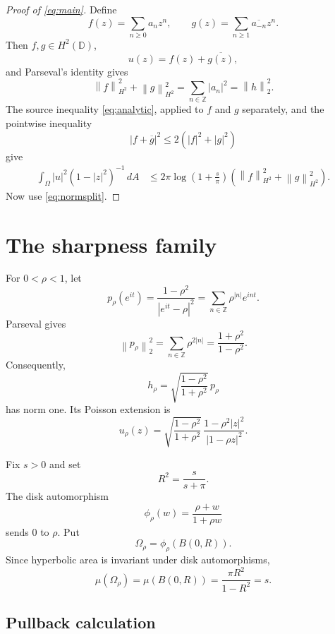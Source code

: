 \documentclass[11pt]{article}
\newcommand{\D}{\mathbb D}
\newcommand{\dd}{\,d}
\newcommand{\norm}[1]{\left\lVert#1\right\rVert}
\begin{document}
\begin{proof}[Proof of \eqref{eq:main}]
Define
\[
 f(z)=\sum_{n\ge0}a_nz^n,
 \qquad
 g(z)=\sum_{n\ge1}\overline{a_{-n}}z^n.
\]
Then \(f,g\in H^2(\D)\),
\[
 u(z)=f(z)+\overline{g(z)},
\]
and Parseval's identity gives
\begin{equation}\label{eq:normsplit}
 \norm{f}_{H^2}^2+\norm{g}_{H^2}^2
 =\sum_{n\in\mathbb Z}|a_n|^2
 =\norm{h}_2^2.
\end{equation}
The source inequality \eqref{eq:analytic}, applied to \(f\) and \(g\)
separately, and the pointwise inequality
\[
 |f+\overline g|^2\le2(|f|^2+|g|^2)
\]
give
\begin{align*}
 \int_\Omega |u|^2(1-|z|^2)^{-1}\dd A
 &\le
 2\pi\log\!\left(1+\frac{s}{\pi}\right)
 \left(\norm{f}_{H^2}^2+\norm{g}_{H^2}^2\right).
\end{align*}
Now use \eqref{eq:normsplit}.
\end{proof}

\section{The sharpness family}

For \(0<\rho<1\), let
\[
 p_\rho(e^{it})
 =\frac{1-\rho^2}{|e^{it}-\rho|^2}
 =\sum_{n\in\mathbb Z}\rho^{|n|}e^{int}.
\]
Parseval gives
\[
 \norm{p_\rho}_2^2
 =\sum_{n\in\mathbb Z}\rho^{2|n|}
 =\frac{1+\rho^2}{1-\rho^2}.
\]
Consequently,
\begin{equation}\label{eq:hrho}
 h_\rho
 =\sqrt{\frac{1-\rho^2}{1+\rho^2}}\,p_\rho
\end{equation}
has norm one. Its Poisson extension is
\begin{equation}\label{eq:urho}
 u_\rho(z)
 =\sqrt{\frac{1-\rho^2}{1+\rho^2}}\,
   \frac{1-\rho^2|z|^2}{|1-\rho z|^2}.
\end{equation}

Fix \(s>0\) and set
\[
 R^2=\frac{s}{s+\pi}.
\]
The disk automorphism
\[
 \phi_\rho(w)=\frac{\rho+w}{1+\rho w}
\]
sends \(0\) to \(\rho\). Put
\[
 \Omega_\rho=\phi_\rho(B(0,R)).
\]
Since hyperbolic area is invariant under disk automorphisms,
\begin{equation}\label{eq:area}
 \mu(\Omega_\rho)=\mu(B(0,R))
 =\frac{\pi R^2}{1-R^2}=s.
\end{equation}

\subsection{Pullback calculation}
\end{document}
